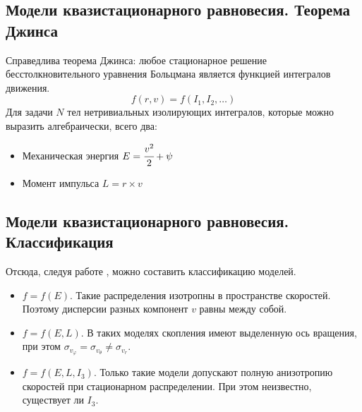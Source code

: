 \documentclass{beamer}
\begin{document}
\subsection{Модели квазистационарного равновесия. Теорема Джинса}
\begin{frame}
    Справедлива теорема Джинса: любое стационарное решение бесстолкновительного уравнения Больцмана является функцией интегралов движения.
    \begin{equation*}
        f(r, v) = f(I_1, I_2, \dots)
    \end{equation*}
    Для задачи $N$ тел нетривиальных изолирующих интегралов, которые можно выразить алгебраически, всего два:
    \begin{itemize}
        \item Механическая энергия $E = \cfrac{v^2}{2} + \psi$
        \item Момент импульса $L = r \times  v$
    \end{itemize}
\end{frame}
\subsection{Модели квазистационарного равновесия. Классификация}
\begin{frame}
Отсюда, следуя работе \cite{BOOK}, можно составить классификацию моделей.
\begin{itemize}
    \item $f = f(E)$. Такие распределения изотропны в пространстве скоростей. Поэтому дисперсии разных компонент $v$ равны между собой.
    \item $f = f(E, L)$. В таких моделях скопления имеют выделенную ось вращения, при этом $\sigma_{v_\varphi} = \sigma_{v_\theta} \neq \sigma_{v_r}$.
    \item $f = f(E, L, I_3)$. Только такие модели допускают полную анизотропию скоростей при стационарном распределении. При этом неизвестно, существует ли $I_3$.
\end{itemize}
\end{frame}
\end{document}
